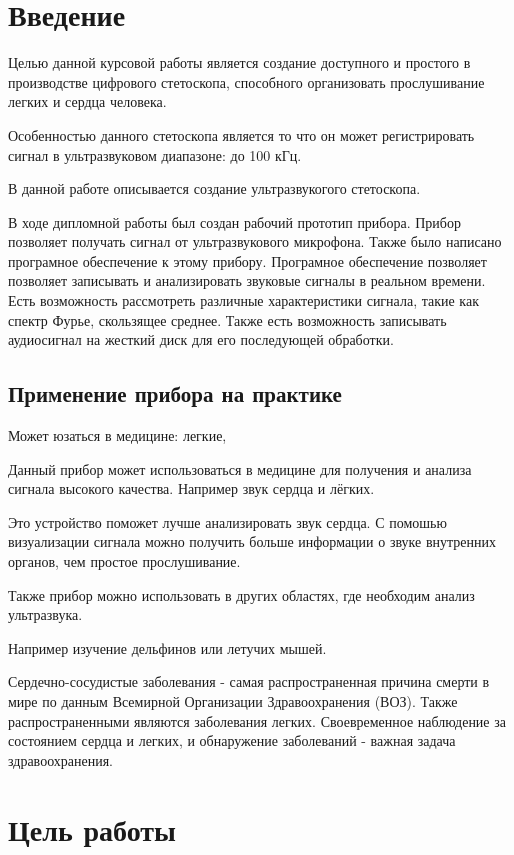 \tableofcontents
\newpage 
\section{Введение}
Целью данной курсовой работы является создание доступного и простого в производстве цифрового стетоскопа, способного организовать прослушивание легких и сердца человека.

Особенностью данного стетоскопа является то что он может регистрировать сигнал в ультразвуковом диапазоне: до 100 кГц.

В данной работе описывается создание ультразвукогого стетоскопа.

В ходе дипломной работы был создан рабочий прототип прибора. Прибор позволяет получать сигнал от ультразвукового микрофона. Также было написано програмное обеспечение к этому прибору. Програмное обеспечение позволяет позволяет записывать и анализировать звуковые сигналы в реальном времени. Есть возможность рассмотреть различные характеристики сигнала, такие как спектр Фурье, скользящее среднее. Также есть возможность записывать аудиосигнал на жесткий диск для его последующей обработки.

\subsection{Применение прибора на практике}
Может юзаться в медицине: легкие, 

Данный прибор может использоваться в медицине для получения и анализа сигнала высокого качества. Например звук сердца и лёгких. 

Это устройство поможет лучше анализировать звук сердца. С помошью визуализации сигнала можно получить больше информации о звуке внутренних органов, чем простое прослушивание.

Также прибор можно использовать в других областях, где необходим анализ ультразвука. 

Например изучение дельфинов или летучих мышей. 

Сердечно-сосудистые заболевания - самая распространенная причина смерти в мире по данным Всемирной Организации Здравоохранения (ВОЗ). Также распространенными являются заболевания легких. Своевременное наблюдение за состоянием сердца и легких, и обнаружение заболеваний - важная задача здравоохранения.

\newpage 
\section{Цель работы}

